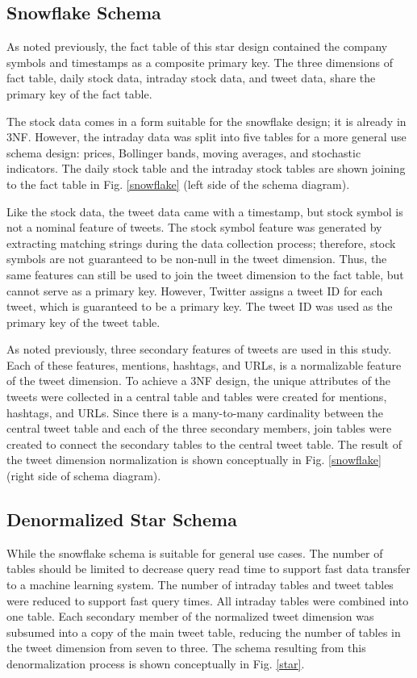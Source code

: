\documentclass[journal]{IEEEtran}
\begin{document}
\subsection{Snowflake Schema}

As noted previously, the fact table of this star design contained the
 company symbols and timestamps as a composite primary key.
The three dimensions of fact table, daily stock data, intraday stock data, and 
 tweet data, share the primary key of the fact table.

The stock data comes in a form suitable for the snowflake design; 
 it is already in 3NF.
However, the intraday data was split into five tables for a more 
 general use schema design: prices, Bollinger bands, moving averages,
 and stochastic indicators.
The daily stock table and the intraday stock tables are shown joining to the 
 fact table in Fig. \ref{snowflake} (left side of the schema diagram).

Like the stock data, the tweet data came with a timestamp, but stock symbol
 is not a nominal feature of tweets.
The stock symbol feature was generated by extracting matching strings
 during the data collection process; therefore, stock symbols are not
 guaranteed to be non-null in the tweet dimension.
Thus, the same features can still be used to join the tweet dimension to the 
fact table, but cannot serve as a primary key.
However, Twitter assigns a tweet ID for each tweet, which is guaranteed to be
 a primary key.
The tweet ID was used as the primary key of the tweet table.

As noted previously, three secondary features of tweets are used in this study.
Each of these features, mentions, hashtags, and URLs, is a normalizable
 feature of the tweet dimension.
To achieve a 3NF design, the unique attributes of the tweets were collected
 in a central table and tables were created for mentions, hashtags, and URLs.
Since there is a many-to-many cardinality between the central tweet table and each of 
 the three secondary members, join tables were created to connect the secondary tables 
 to the central tweet table. 
The result of the tweet dimension normalization is shown conceptually
 in Fig. \ref{snowflake} (right side of schema diagram).

\subsection{Denormalized Star Schema}

While the snowflake schema is suitable for general use cases.
The number of tables should be limited to decrease query read time to support
 fast data transfer to a machine learning system.
The number of intraday tables and tweet tables were reduced to support
 fast query times.
All intraday tables were combined into one table. 
Each secondary member of the normalized tweet dimension was
 subsumed into a copy of the main tweet table, reducing the number of tables
 in the tweet dimension from seven to three.
The schema resulting from this denormalization process is shown
 conceptually in Fig. \ref{star}.
\end{document}
